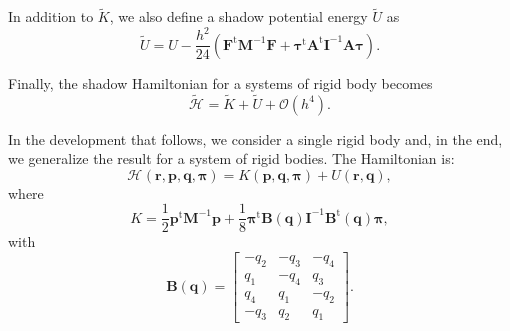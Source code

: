 \documentclass[journal=jctcce,manuscript=article,layout=twocolumn]{achemso}
\newcommand{\mt}[1]{\boldsymbol{\mathbf{#1}}}   %
\newcommand{\vt}[1]{\boldsymbol{\mathbf{#1}}}   %
\newcommand{\tr}[1]{#1^\text{t}}                %
\newcommand{\Ham}[1]{{\mathcal H}_\text{#1}}    %
\newcommand{\timestep}{h}
\newcommand{\modified}[1]{\widetilde{#1}}
\begin{document}
In addition to $\modified K$, we also define a shadow potential energy $\modified U$ as
\begin{equation*}
\modified U = U - \frac{\timestep^2}{24} \left( \tr{\vt F} {\mt M}^{-1} {\vt F} + \tr{\vt \tau} \tr{\mt A} {\mt I}^{-1} {\mt A} {\vt \tau} \right).
\end{equation*}

Finally, the shadow Hamiltonian for a systems of rigid body becomes
\begin{equation}
\modified{\Ham{}} = \modified K + \modified U + \mathcal{O}(h^4).
\end{equation}

In the development that follows, we consider a single rigid body and, in the end, we generalize the result for a system of rigid bodies. The Hamiltonian is:
\begin{equation*}
\Ham{}(\vt r, \vt p, \vt q, \vt \pi) = K(\vt p, \vt q, \vt \pi) + U(\vt r, \vt q),
\end{equation*}
where
\begin{equation*}
K = \frac{1}{2} \tr{\vt p}{\mt M}^{-1}{\vt p} + \frac{1}{8}\tr{\vt \pi} {\mt B}(\vt q) {\mt I}^{-1} \tr{\mt B}(\vt q) \vt \pi,
\end{equation*}
with
\begin{equation*}
\mt B(\vt q) = \left[\begin{array}{rrrr}
-q_2 & -q_3 & -q_4 \\
q_1 & -q_4 &  q_3 \\
q_4 &  q_1 & -q_2 \\
-q_3 &  q_2 &  q_1
\end{array}\right].
\end{equation*}
\end{document}
